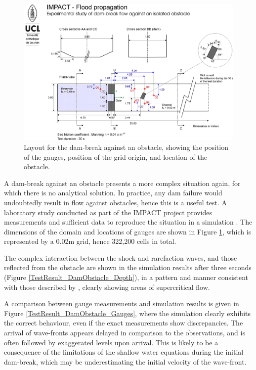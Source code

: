 \begin{figure}
	\centering
	\includegraphics[width=1.0\textwidth]{numerical-test-figures/dam-break-obstacle-layout.png}
	\caption{Layout for the dam-break against an obstacle, showing the position of the gauges, position of the grid origin, and location of the obstacle.}
	\label{TestResult_DamObstacle_Domain}
\end{figure}

A dam-break against an obstacle presents a more complex situation again, for which there is no analytical solution. In practice, any dam failure would undoubtedly result in flow against obstacles, hence this is a useful test. A laboratory study conducted as part of the IMPACT project provides measurements and sufficient data to reproduce the situation in a simulation \citep{SoaresFrazao2007}. The dimensions of the domain and locations of gauges are shown in Figure \ref{TestResult_DamObstacle_Domain}, which is represented by a 0.02m grid, hence 322,200 cells in total.

The complex interaction between the shock and rarefaction waves, and those reflected from the obstacle are shown in the simulation results after three seconds (Figure \ref{TestResult_DamObstacle_Depth}), in a pattern and manner consistent with those described by \citet{SoaresFrazao2007}, clearly showing areas of supercritical flow.

A comparison between gauge measurements and simulation results is given in Figure \ref{TestResult_DamObstacle_Gauges}, where the simulation clearly exhibits the correct behaviour, even if the exact measurements show discrepancies. The arrival of wave-fronts appears delayed in comparison to the observations, and is often followed by exaggerated levels upon arrival. This is likely to be a consequence of the limitations of the shallow water equations during the initial dam-break, which may be underestimating the initial velocity of the wave-front.

